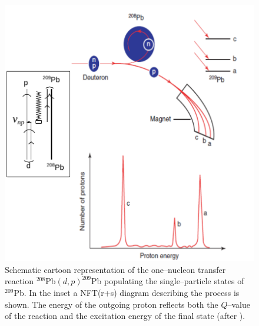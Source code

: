 \begin{figure}
\centerline {
\includegraphics*[width=12cm]{introduccion/figs/figintro2}
}
\caption{Schematic cartoon representation of the one--nucleon transfer reaction $^{208}$Pb$(d,p)^{209}$Pb populating the single--particle states of $^{209}$Pb. In the inset a NFT(r+s) diagram describing the process is shown. The energy of the outgoing proton reflects both the $Q$--value of the reaction and the excitation energy of the final state (after \cite{Mottelson:76b}).}
\label{figintro2}
\end{figure}
